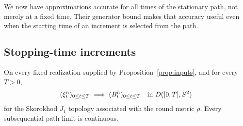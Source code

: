 We now have approximations accurate for all times of the stationary path,
not merely at a fixed time. Their generator bound makes that accuracy useful
even when the starting time of an increment is selected from the path.

\subsection{Stopping-time increments}

\begin{proposition}\label{prop:path-limit}
On every fixed realization supplied by Proposition~\ref{prop:inputs}, and for
every $T>0$,
\[
 (\xi^n_t)_{0\le t\le T}\ \Longrightarrow\
 (B^h_t)_{0\le t\le T}
 \quad\hbox{in }D([0,T],S^2)
\]
for the Skorokhod $J_1$ topology associated with the round metric $\rho$.
Every subsequential path limit is continuous.
\end{proposition}

